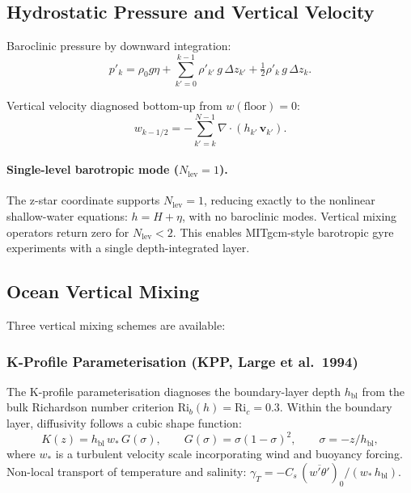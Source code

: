 \documentclass[11pt,a4paper]{article}
\newcommand{\half}{\tfrac{1}{2}}
\begin{document}
\subsection{Hydrostatic Pressure and Vertical Velocity}

Baroclinic pressure by downward integration:
\begin{equation}
  p'_k = \rho_0 g\eta + \sum_{k'=0}^{k-1}\rho'_{k'}\,g\,\Delta z_{k'} + \half\rho'_k\,g\,\Delta z_k.
\end{equation}

Vertical velocity diagnosed bottom-up from $w(\text{floor})=0$:
\begin{equation}
  w_{k-1/2} = -\sum_{k'=k}^{N-1}\nabla\!\cdot\!(h_{k'}\,\bm v_{k'}).
\end{equation}

\paragraph{Single-level barotropic mode ($N_{\mathrm{lev}}=1$).}
The z-star coordinate supports $N_{\mathrm{lev}}=1$, reducing exactly to the nonlinear shallow-water equations: $h = H + \eta$, with no baroclinic modes.  Vertical mixing operators return zero for $N_{\mathrm{lev}}<2$.  This enables MITgcm-style barotropic gyre experiments with a single depth-integrated layer.

\subsection{Ocean Vertical Mixing}

Three vertical mixing schemes are available:

\subsubsection{K-Profile Parameterisation (KPP, Large et al.\ 1994)}
The K-profile parameterisation \citep{LMD1994} diagnoses the boundary-layer
depth $h_{\mathrm{bl}}$ from the bulk Richardson number criterion $\mathrm{Ri}_b(h)=\mathrm{Ri}_c=0.3$.  Within the boundary layer, diffusivity follows a cubic shape function:
\begin{equation}
  K(z) = h_{\mathrm{bl}}\,w_*\,G(\sigma), \qquad G(\sigma)=\sigma(1-\sigma)^2, \qquad \sigma=-z/h_{\mathrm{bl}},
\end{equation}
where $w_*$ is a turbulent velocity scale incorporating wind and buoyancy forcing.  Non-local transport of temperature and salinity: $\gamma_T=-C_s\,(\overline{w'\theta'})_0/(w_*\,h_{\mathrm{bl}})$.
\end{document}
